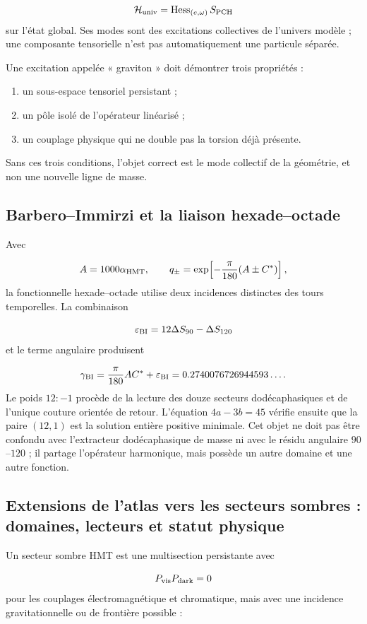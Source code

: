 \[
 \mathcal H_{\rm univ}
 =\operatorname{Hess}_{(e,\omega)}S_{\rm PCH}
\]
sur l'état global. Ses modes sont des excitations collectives de l'univers modèle ; une composante tensorielle n'est pas automatiquement une particule séparée.

Une excitation appelée « graviton » doit démontrer trois propriétés :

\begin{enumerate}
\item un sous-espace tensoriel persistant ;
\item un pôle isolé de l'opérateur linéarisé ;
\item un couplage physique qui ne double pas la torsion déjà présente.
\end{enumerate}
Sans ces trois conditions, l'objet correct est le mode collectif de la géométrie, et non une nouvelle ligne de masse.

\subsection{Barbero–Immirzi et la liaison hexade–octade}
Avec

\[
 A=1000\alpha_{\rm HMT},
\qquad
 q_\pm=\exp\!\left[-\frac{\pi}{180}(A\pm C^*)\right],
\]
la fonctionnelle hexade--octade utilise deux incidences distinctes des tours temporelles. La combinaison

\[
 \varepsilon_{\rm BI}
 =12\Delta S_{90}-\Delta S_{120}
\]
et le terme angulaire produisent

\[
 \gamma_{\rm BI}
 =\frac{\pi}{180}AC^*
 +\varepsilon_{\rm BI}
 =0.2740076726944593\ldots.
\]
Le poids \(12:-1\) procède de la lecture des douze secteurs dodécaphasiques
et de l'unique couture orientée de retour. L'équation
\(4a-3b=45\) vérifie ensuite que la paire \((12,1)\) est la solution
entière positive minimale. Cet objet ne doit pas être confondu avec l'extracteur dodécaphasique de masse ni avec le résidu angulaire \(90\)--\(120\) ; il partage l'opérateur harmonique, mais possède un autre domaine et une autre fonction.

\subsection{Extensions de l'atlas vers les secteurs sombres : domaines, lecteurs et statut physique}
Un secteur sombre HMT est une multisection persistante avec

\[
 P_{\rm vis}P_{\rm dark}=0
\]
pour les couplages électromagnétique et chromatique, mais avec une incidence gravitationnelle ou de frontière possible :

